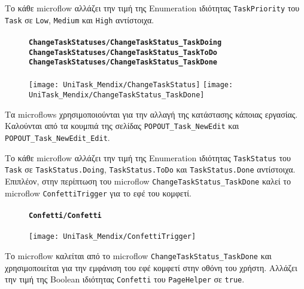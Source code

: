                 Το κάθε microflow αλλάζει την τιμή της Enumeration ιδιότητας \texttt{TaskPriority} του \texttt{Task} σε \texttt{Low}, \texttt{Medium} και \texttt{High} αντίστοιχα.

                \begin{figure}[H] \noindent
                    \paragraph{\texttt{ChangeTaskStatuses/ChangeTaskStatus\_TaskDoing} \\ \texttt{ChangeTaskStatuses/ChangeTaskStatus\_TaskToDo} \\ \texttt{ChangeTaskStatuses/ChangeTaskStatus\_TaskDone}}
                    \begin{center}
                        \texttt{[image: UniTask\_Mendix/ChangeTaskStatus]}
                        \texttt{[image: UniTask\_Mendix/ChangeTaskStatus\_TaskDone]}
                    \end{center}
                \end{figure}

                Τα microflows χρησιμοποιούνται για την αλλαγή της κατάστασης κάποιας εργασίας. Καλούνται από τα κουμπιά της σελίδας \texttt{POPOUT\_Task\_NewEdit} και \texttt{POPOUT\_Task\_NewEdit\_Edit}.

                Το κάθε microflow αλλάζει την τιμή της Enumeration ιδιότητας \texttt{TaskStatus} του \texttt{Task} σε \texttt{TaskStatus.Doing}, \texttt{TaskStatus.ToDo} και \texttt{TaskStatus.Done} αντίστοιχα. Επιπλέον, στην περίπτωση του microflow \texttt{ChangeTaskStatus\_TaskDone} καλεί το microflow \texttt{ConfettiTrigger} για το εφέ του κομφετί.

                \begin{figure}[H] \noindent
                    \paragraph{\texttt{Confetti/Confetti}}
                    \begin{center}
                        \texttt{[image: UniTask\_Mendix/ConfettiTrigger]}
                    \end{center}
                \end{figure}

                Το microflow καλείται από το microflow \texttt{ChangeTaskStatus\_TaskDone} και χρησιμοποιείται για την εμφάνιση του εφέ κομφετί στην οθόνη του χρήστη. Αλλάζει την τιμή της Boolean ιδιότητας \texttt{Confetti} του \texttt{PageHelper} σε \texttt{true}.

